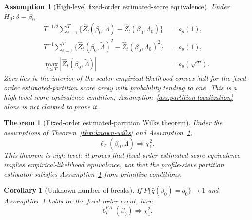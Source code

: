 \documentclass[12pt]{article} %
\numberwithin{equation}{section}
\newtheorem{theorem}{Theorem}
\newtheorem{corollary}{Corollary}
\newtheorem{assumption}{Assumption}
\theoremstyle{definition}
\begin{document}
\begin{assumption}[High-level fixed-order estimated-score equivalence]
\label{ass:estimated-score}
Under \(H_0:\beta=\beta_0\),
\begin{align}
    T^{-1/2}\sum_{t=1}^T
    \{\widehat Z_t(\beta_0,\widetilde\Lambda)-\widehat Z_t(\beta_0,\Lambda_0)\}
    &=o_p(1),
    \label{eq:estimated-score-num}\\
    T^{-1}\sum_{t=1}^T
    \{\widehat Z_t(\beta_0,\widetilde\Lambda)^2-\widehat Z_t(\beta_0,\Lambda_0)^2\}
    &=o_p(1),
    \label{eq:estimated-score-den}\\
    \max_{t\leq T}|\widehat Z_t(\beta_0,\widetilde\Lambda)|&=o_p(\sqrt T).
    \label{eq:estimated-score-max}
\end{align}
Zero lies in the interior of the scalar empirical-likelihood convex hull for the fixed-order estimated-partition score array with probability tending to one. This is a high-level score-equivalence condition; Assumption~\ref{ass:partition-localization} alone is not claimed to prove it.
\end{assumption}

\begin{theorem}[Fixed-order estimated-partition Wilks theorem]
\label{thm:estimated-equiv}
Under the assumptions of Theorem~\ref{thm:known-wilks} and Assumption~\ref{ass:estimated-score},
\[
    \ell_T(\beta_0,\widetilde\Lambda)\Rightarrow\chi_1^2.
\]
This theorem is high-level: it proves that fixed-order estimated-score equivalence implies empirical-likelihood equivalence, not that the profile-sieve partition estimator satisfies Assumption~\ref{ass:estimated-score} from primitive conditions.
\end{theorem}

\begin{corollary}[Unknown number of breaks]
\label{cor:qhat}
If \(P\{\widehat q(\beta_0)=q_0\}\to1\) and Assumption~\ref{ass:estimated-score} holds on the fixed-order event, then
\[
    \ell_T^{BA}(\beta_0)\Rightarrow\chi_1^2.
\]
\end{corollary}
\end{document}
